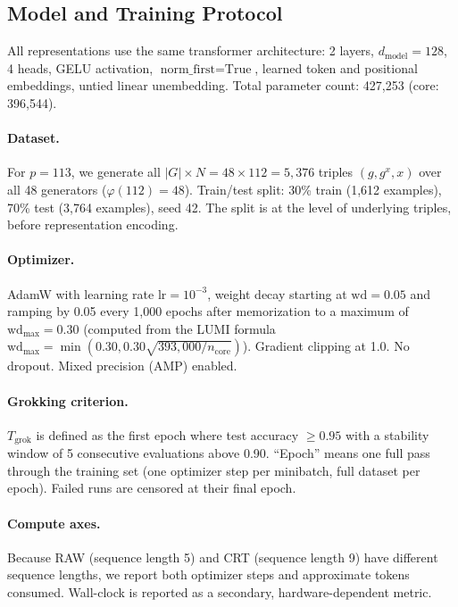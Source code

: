\documentclass[11pt,a4paper]{article}
\theoremstyle{definition}
\theoremstyle{remark}
\newcommand{\dmodel}{d_{\mathrm{model}}}
\begin{document}
\subsection{Model and Training Protocol}
\label{sec:protocol}

All representations use the same transformer architecture: 2 layers, $\dmodel = 128$, 4 heads, GELU activation, $\text{norm\_first} = \text{True}$, learned token and positional embeddings, untied linear unembedding. Total parameter count: 427,253 (core: 396,544).

\paragraph{Dataset.} For $p = 113$, we generate all $|G| \times N = 48 \times 112 = 5{,}376$ triples $(g, g^x, x)$ over all 48 generators ($\varphi(112) = 48$). Train/test split: 30\% train (1,612 examples), 70\% test (3,764 examples), seed 42. The split is at the level of underlying triples, before representation encoding.

\paragraph{Optimizer.} AdamW with learning rate $\text{lr} = 10^{-3}$, weight decay starting at $\text{wd} = 0.05$ and ramping by 0.05 every 1,000 epochs after memorization to a maximum of $\text{wd}_{\max} = 0.30$ (computed from the LUMI formula $\text{wd}_{\max} = \min(0.30, 0.30 \sqrt{393{,}000 / n_{\text{core}}})$). Gradient clipping at 1.0. No dropout. Mixed precision (AMP) enabled.

\paragraph{Grokking criterion.} $T_{\mathrm{grok}}$ is defined as the first epoch where test accuracy $\geq 0.95$ with a stability window of 5 consecutive evaluations above 0.90. ``Epoch'' means one full pass through the training set (one optimizer step per minibatch, full dataset per epoch). Failed runs are censored at their final epoch.

\paragraph{Compute axes.} Because RAW (sequence length 5) and CRT (sequence length 9) have different sequence lengths, we report both optimizer steps and approximate tokens consumed. Wall-clock is reported as a secondary, hardware-dependent metric.
\end{document}

